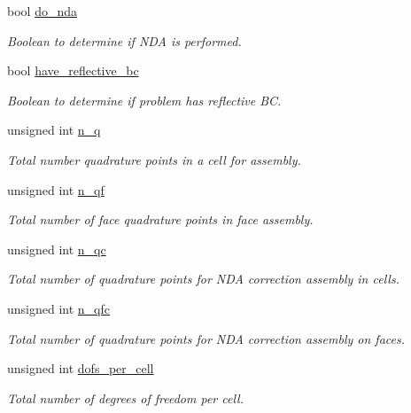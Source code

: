 \begin{DoxyCompactItemize}
bool \hyperlink{class_equation_base_a908f21db148a15d7d51a8508aa1fc58a}{do\+\_\+nda}
\begin{DoxyCompactList}\small\item\em Boolean to determine if N\+DA is performed. \end{DoxyCompactList}\item 
bool \hyperlink{class_equation_base_a145ca193add91b43e7a00d6f35c0e1fb}{have\+\_\+reflective\+\_\+bc}
\begin{DoxyCompactList}\small\item\em Boolean to determine if problem has reflective BC. \end{DoxyCompactList}\item 
unsigned int \hyperlink{class_equation_base_a8b8a299e37005a06a089ace9f473f94e}{n\+\_\+q}
\begin{DoxyCompactList}\small\item\em Total number quadrature points in a cell for assembly. \end{DoxyCompactList}\item 
unsigned int \hyperlink{class_equation_base_ad0bad2bd155657e65a923910e5b114aa}{n\+\_\+qf}
\begin{DoxyCompactList}\small\item\em Total number of face quadrature points in face assembly. \end{DoxyCompactList}\item 
unsigned int \hyperlink{class_equation_base_a001c60e6c8df319b9f267688f84471da}{n\+\_\+qc}
\begin{DoxyCompactList}\small\item\em Total number of quadrature points for N\+DA correction assembly in cells. \end{DoxyCompactList}\item 
unsigned int \hyperlink{class_equation_base_a5cb013018da03250a101941f196df23b}{n\+\_\+qfc}
\begin{DoxyCompactList}\small\item\em Total number of quadrature points for N\+DA correction assembly on faces. \end{DoxyCompactList}\item 
unsigned int \hyperlink{class_equation_base_a66b4cac3e416505fba70789599a98d14}{dofs\+\_\+per\+\_\+cell}
\begin{DoxyCompactList}\small\item\em Total number of degrees of freedom per cell. \end{DoxyCompactList}\item 

\end{DoxyCompactItemize}
